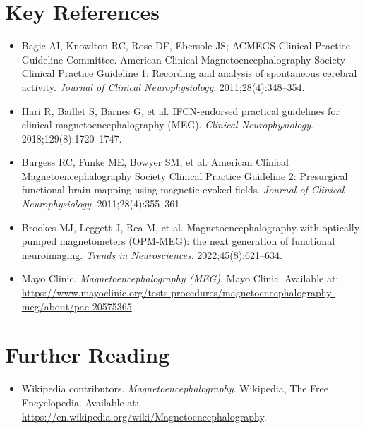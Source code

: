 \section{Key References}
\begin{itemize}
  \item Bagic AI, Knowlton RC, Rose DF, Ebersole JS; ACMEGS Clinical Practice Guideline Committee. American Clinical Magnetoencephalography Society Clinical Practice Guideline 1: Recording and analysis of spontaneous cerebral activity. \textit{Journal of Clinical Neurophysiology}. 2011;28(4):348--354.
  \item Hari R, Baillet S, Barnes G, et al. IFCN-endorsed practical guidelines for clinical magnetoencephalography (MEG). \textit{Clinical Neurophysiology}. 2018;129(8):1720--1747.
  \item Burgess RC, Funke ME, Bowyer SM, et al. American Clinical Magnetoencephalography Society Clinical Practice Guideline 2: Presurgical functional brain mapping using magnetic evoked fields. \textit{Journal of Clinical Neurophysiology}. 2011;28(4):355--361.
  \item Brookes MJ, Leggett J, Rea M, et al. Magnetoencephalography with optically pumped magnetometers (OPM-MEG): the next generation of functional neuroimaging. \textit{Trends in Neurosciences}. 2022;45(8):621--634.
  \item Mayo Clinic. \textit{Magnetoencephalography (MEG)}. Mayo Clinic. Available at: \url{https://www.mayoclinic.org/tests-procedures/magnetoencephalography-meg/about/pac-20575365}.
\end{itemize}

\section{Further Reading}
\begin{itemize}
  \item Wikipedia contributors. \textit{Magnetoencephalography}. Wikipedia, The Free Encyclopedia. Available at: \url{https://en.wikipedia.org/wiki/Magnetoencephalography}.
\end{itemize}
